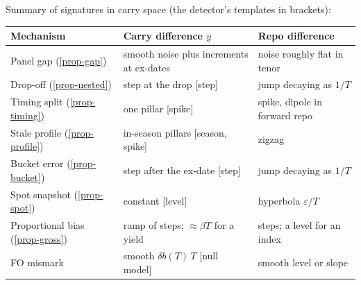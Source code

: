 \begin{insight}
Summary of signatures in carry space (the detector's templates in brackets):
\begin{center}\small
\begin{tabular}{p{4.2cm}p{4.8cm}p{4.6cm}}
\toprule
Mechanism & Carry difference $y$ & Repo difference\\
\midrule
Panel gap (\ref{prop-gap}) & smooth noise plus increments at ex-dates & noise roughly flat in tenor\\
Drop-off (\ref{prop-nested}) & step at the drop [step] & jump decaying as $1/T$\\
Timing split (\ref{prop-timing}) & one pillar [spike] & spike, dipole in forward repo\\
Stale profile (\ref{prop-profile}) & in-season pillars [season, spike] & zigzag\\
Bucket error (\ref{prop-bucket}) & step after the ex-date [step] & jump decaying as $1/T$\\
Spot snapshot (\ref{prop-spot}) & constant [level] & hyperbola $\varepsilon/T$\\
Proportional bias (\ref{prop-gross}) & ramp of steps; $\approx\beta T$ for a yield & steps; a level for an index\\
FO mismark & smooth $\delta b(T)\,T$ [null model] & smooth level or slope\\
\bottomrule
\end{tabular}
\end{center}
\end{insight}
